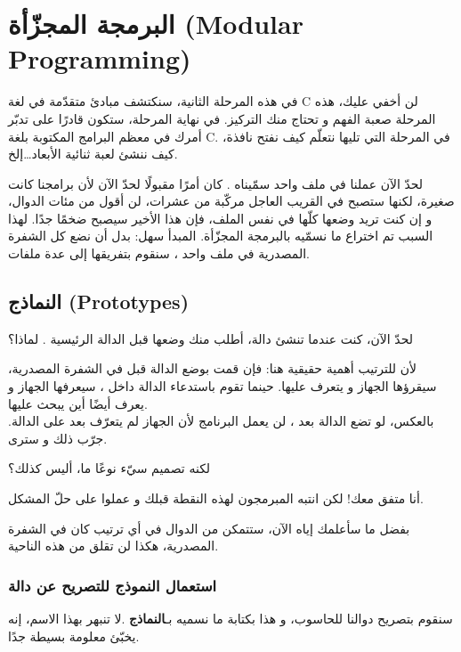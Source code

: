 \chapter{البرمجة المجزّأة (\textenglish{Modular Programming})}

في هذه المرحلة الثانية، سنكتشف مبادئ متقدّمة في لغة \textenglish{C}
 لن أخفي عليك، هذه المرحلة صعبة الفهم و تحتاج منك التركيز. في نهاية المرحلة، ستكون قادرًا على تدبّر أمرك في معظم البرامج المكتوبة بلغة \textenglish{C}. 
في المرحلة التي تليها نتعلّم كيف نفتح نافذة، كيف ننشئ لعبة ثنائية الأبعاد\dots إلخ.

لحدّ الآن عملنا في ملف واحد سمّيناه
.
كان أمرًا مقبولًا لحدّ الآن لأن برامجنا كانت صغيرة، لكنها ستصبح في القريب العاجل مركّبة من عشرات، لن أقول من مئات الدوال، و إن كنت تريد وضعها كلّها في نفس الملف، فإن هذا الأخير سيصبح ضخمًا جدًا. لهذا السبب تم اختراع ما نسمّيه بالبرمجة المجزّأة. المبدأ سهل: بدل أن نضع كل الشفرة المصدرية في ملف واحد
، سنقوم بتفريقها إلى عدة ملفات.

\section{النماذج (\textenglish{Prototypes})}

لحدّ الآن، كنت عندما تنشئ دالة، أطلب منك وضعها قبل الدالة الرئيسية
. لماذا؟

لأن للترتيب أهمية حقيقية هنا: فإن قمت بوضع الدالة قبل 
في الشفرة المصدرية، سيقرؤها الجهاز و يتعرف عليها. حينما تقوم باستدعاء الدالة داخل 
، سيعرفها الجهاز و يعرف أيضًا أين يبحث عليها.\\
بالعكس، لو تضع الدالة بعد 
، لن يعمل البرنامج لأن الجهاز لم يتعرّف بعد على الدالة. جرّب ذلك و سترى.

\begin{question}
  لكنه تصميم سيّء نوعًا ما، أليس كذلك؟
\end{question}

أنا متفق معك! لكن انتبه المبرمجون لهذه النقطة قبلك و عملوا على حلّ المشكل.

بفضل ما سأعلمك إياه الآن، ستتمكن من الدوال في أي ترتيب كان في الشفرة المصدرية، هكذا لن تقلق من هذه الناحية.

\subsection{استعمال النموذج للتصريح عن دالة}

سنقوم بتصريح دوالنا للحاسوب، و هذا بكتابة ما نسميه بـ\textbf{النماذج}
.لا تنبهر بهذا الاسم، إنه يخبّئ معلومة بسيطة جدًا.

